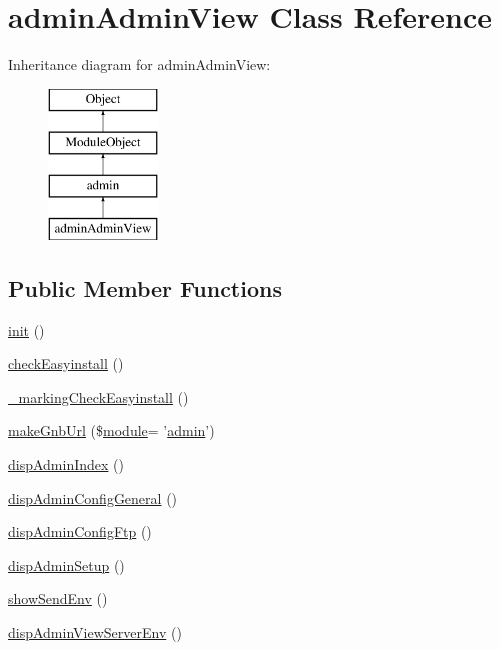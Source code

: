 \hypertarget{classadminAdminView}{\section{admin\+Admin\+View Class Reference}
\label{classadminAdminView}
}
Inheritance diagram for admin\+Admin\+View\+:\begin{figure}[H]
\begin{center}
\leavevmode
\includegraphics[height=4.000000cm]{classadminAdminView}
\end{center}
\end{figure}
\subsection*{Public Member Functions}
\begin{DoxyCompactItemize}
\item 
\hyperlink{classadminAdminView_a9211d29a895ebead46f78e6fc9eab285}{init} ()
\item 
\hyperlink{classadminAdminView_ae7b11554f7c30beb8554d15b33852dd7}{check\+Easyinstall} ()
\item 
\hyperlink{classadminAdminView_ad1fe5e140900ad8f5814871ed6ae9508}{\+\_\+marking\+Check\+Easyinstall} ()
\item 
\hyperlink{classadminAdminView_ade77034df3a5bc074b5a1f1cb4c47419}{make\+Gnb\+Url} (\$\hyperlink{classmodule}{module}= '\hyperlink{classadmin}{admin}')
\item 
\hyperlink{classadminAdminView_aff78cea8f2e5632395dd4888742389b8}{disp\+Admin\+Index} ()
\item 
\hyperlink{classadminAdminView_accaee16084bc6def9e841518d227be0e}{disp\+Admin\+Config\+General} ()
\item 
\hyperlink{classadminAdminView_ac1d596c739213d4fd3f127a6ca18c155}{disp\+Admin\+Config\+Ftp} ()
\item 
\hyperlink{classadminAdminView_acfa4a5d1209080974ca5fd15d04565e9}{disp\+Admin\+Setup} ()
\item 
\hyperlink{classadminAdminView_a4c4c900f637d618a7c8fbcbf523ad801}{show\+Send\+Env} ()
\item 
\hyperlink{classadminAdminView_a6b110bb8ccba975a670fdfbe559f7118}{disp\+Admin\+View\+Server\+Env} ()
\end{DoxyCompactItemize}
